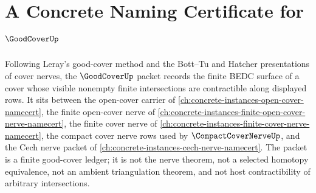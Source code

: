\chapter{A Concrete Naming Certificate for $\GoodCoverUp$}
\label{ch:concrete-instances-good-cover-namecert}

Following Leray's good-cover method and the Bott--Tu and Hatcher presentations of cover nerves, the $\GoodCoverUp$ packet records the finite BEDC surface of a cover whose visible nonempty finite intersections are contractible along displayed rows. It sits between the open-cover carrier of \autoref{ch:concrete-instances-open-cover-namecert}, the finite open-cover nerve of \autoref{ch:concrete-instances-finite-open-cover-nerve-namecert}, the finite cover nerve of \autoref{ch:concrete-instances-finite-cover-nerve-namecert}, the compact cover nerve rows used by $\CompactCoverNerveUp$, and the Cech nerve packet of \autoref{ch:concrete-instances-cech-nerve-namecert}. The packet is a finite good-cover ledger; it is not the nerve theorem, not a selected homotopy equivalence, not an ambient triangulation theorem, and not host contractibility of arbitrary intersections.

